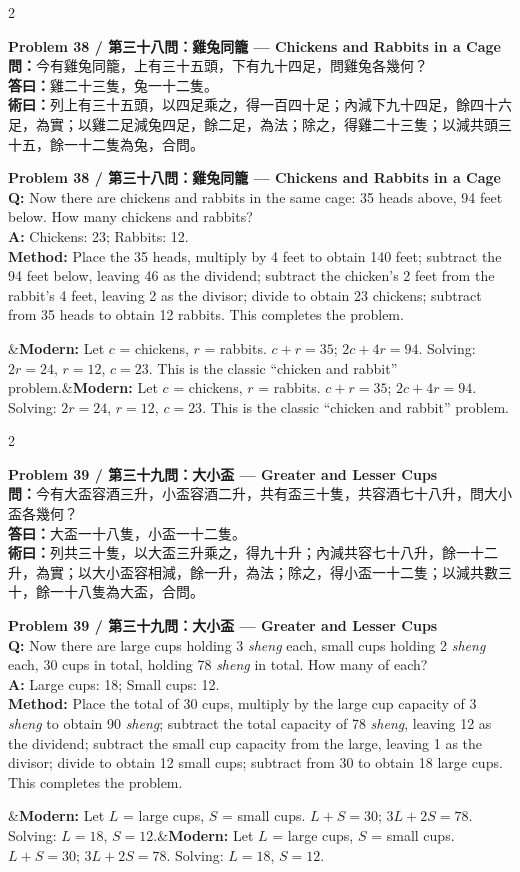 \documentclass[11pt,a4paper]{article}
\newcommand{\bilingualproblem}[4]{%
  \begin{paracol}{2}
  \begin{leftcolumn}
  \noindent\textbf{\color{problemcolor}#1}\\[0.2cm]
  #2
  \end{leftcolumn}
  \switchcolumn
  \noindent\textbf{\color{problemcolor}#1}\\[0.2cm]
  #3
  \end{paracol}
  \ifx&#4&\else\vspace{0.3cm}\noindent#4\fi
  \vspace{0.5cm}
}
\newcommand{\wen}[1]{\textcolor{problemcolor}{\textbf{問：}}#1}
\newcommand{\da}[1]{\textcolor{answercolor}{\textbf{答曰：}}#1}
\newcommand{\shu}[1]{\textcolor{methodcolor}{\textbf{術曰：}}#1}
\newcommand{\wenen}[1]{\textcolor{problemcolor}{\textbf{Q:}} #1}
\newcommand{\daen}[1]{\textcolor{answercolor}{\textbf{A:}} #1}
\newcommand{\shuen}[1]{\textcolor{methodcolor}{\textbf{Method:}} #1}
\begin{document}
\newpage

\bilingualproblem{Problem 38 / 第三十八問：雞兔同籠 --- Chickens and Rabbits in a Cage}{
\wen{今有雞兔同籠，上有三十五頭，下有九十四足，問雞兔各幾何？}\\[0.2cm]
\da{雞二十三隻，兔一十二隻。}\\[0.2cm]
\shu{列上有三十五頭，以四足乘之，得一百四十足；內減下九十四足，餘四十六足，為實；以雞二足減兔四足，餘二足，為法；除之，得雞二十三隻；以減共頭三十五，餘一十二隻為兔，合問。}
}{
\wenen{Now there are chickens and rabbits in the same cage: 35 heads above, 94 feet below. How many chickens and rabbits?}\\[0.2cm]
\daen{Chickens: 23; Rabbits: 12.}\\[0.2cm]
\shuen{Place the 35 heads, multiply by 4 feet to obtain 140 feet; subtract the 94 feet below, leaving 46 as the dividend; subtract the chicken's 2 feet from the rabbit's 4 feet, leaving 2 as the divisor; divide to obtain 23 chickens; subtract from 35 heads to obtain 12 rabbits. This completes the problem.}
}{\textbf{Modern:} Let $c$ = chickens, $r$ = rabbits. $c + r = 35$; $2c + 4r = 94$. Solving: $2r = 24$, $r = 12$, $c = 23$. This is the classic ``chicken and rabbit'' problem.}

\bilingualproblem{Problem 39 / 第三十九問：大小盃 --- Greater and Lesser Cups}{
\wen{今有大盃容酒三升，小盃容酒二升，共有盃三十隻，共容酒七十八升，問大小盃各幾何？}\\[0.2cm]
\da{大盃一十八隻，小盃一十二隻。}\\[0.2cm]
\shu{列共三十隻，以大盃三升乘之，得九十升；內減共容七十八升，餘一十二升，為實；以大小盃容相減，餘一升，為法；除之，得小盃一十二隻；以減共數三十，餘一十八隻為大盃，合問。}
}{
\wenen{Now there are large cups holding 3 \textit{sheng} each, small cups holding 2 \textit{sheng} each, 30 cups in total, holding 78 \textit{sheng} in total. How many of each?}\\[0.2cm]
\daen{Large cups: 18; Small cups: 12.}\\[0.2cm]
\shuen{Place the total of 30 cups, multiply by the large cup capacity of 3 \textit{sheng} to obtain 90 \textit{sheng}; subtract the total capacity of 78 \textit{sheng}, leaving 12 as the dividend; subtract the small cup capacity from the large, leaving 1 as the divisor; divide to obtain 12 small cups; subtract from 30 to obtain 18 large cups. This completes the problem.}
}{\textbf{Modern:} Let $L$ = large cups, $S$ = small cups. $L + S = 30$; $3L + 2S = 78$. Solving: $L = 18$, $S = 12$.}
\end{document}
